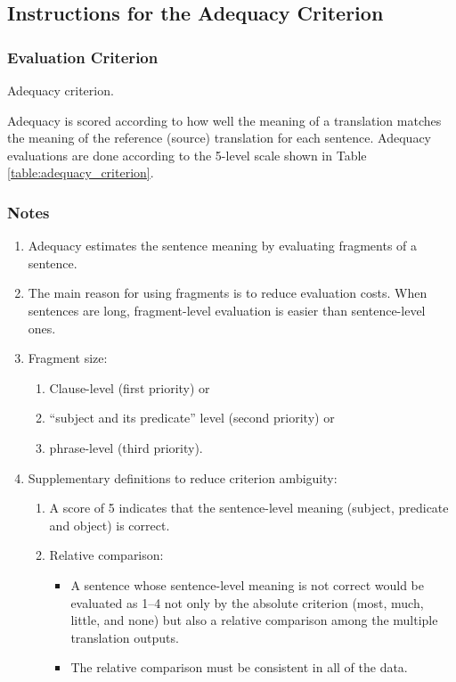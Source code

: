 \documentclass[english]{jnlp_1.4}
\begin{document}
\subsection{Instructions for the Adequacy Criterion}
\label{sec:apn:adequacy}

\subsubsection{Evaluation Criterion}

\begin{table}[b]
\caption{Adequacy criterion.}

\end{table}

Adequacy is scored according to how well the meaning of a translation matches the meaning of the reference (source) translation for each sentence. 
Adequacy evaluations are done according to the 5-level scale shown in Table \ref{table:adequacy_criterion}.


\subsubsection{Notes}

\begin{enumerate}
\item Adequacy estimates the sentence meaning by evaluating fragments of a sentence. 
\item The main reason for using fragments is to reduce evaluation costs. When sentences are long, fragment-level evaluation is easier than sentence-level ones.
\item Fragment size:
\begin{enumerate}
\item Clause-level (first priority) or 
\item ``subject and its predicate'' level (second priority) or 
\item phrase-level (third priority). 
\end{enumerate}
\item Supplementary definitions to reduce criterion ambiguity:
\begin{enumerate}
\item A score of 5 indicates that the sentence-level meaning (subject, predicate and object) is correct.
\item Relative comparison: 
\begin{itemize}
\item A sentence whose sentence-level meaning is not correct would be evaluated as 1--4 not only by the absolute criterion (most, much, little, and none) but also a relative comparison among the multiple translation outputs. 
\item The relative comparison must be consistent in all of the data.
\end{itemize}
\end{enumerate}
\end{enumerate}
\end{document}
